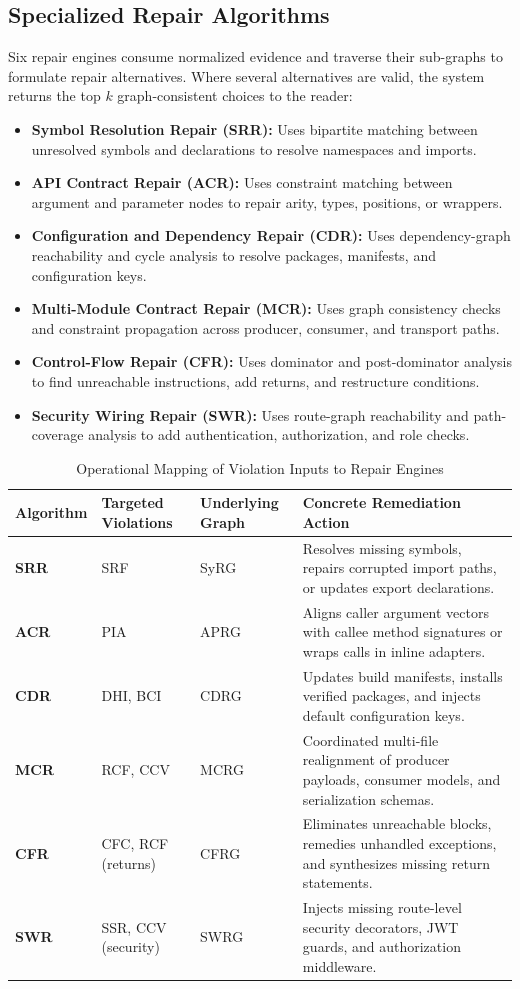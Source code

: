 \documentclass[10pt,a4paper]{article}
\begin{document}
\subsection{Specialized Repair Algorithms}
Six repair engines consume normalized evidence and traverse their sub-graphs to formulate repair alternatives. Where several alternatives are valid, the system returns the top $k$ graph-consistent choices to the reader:
\begin{itemize}
  \item \textbf{Symbol Resolution Repair (SRR):} Uses bipartite matching between unresolved symbols and declarations to resolve namespaces and imports.
  \item \textbf{API Contract Repair (ACR):} Uses constraint matching between argument and parameter nodes to repair arity, types, positions, or wrappers.
  \item \textbf{Configuration and Dependency Repair (CDR):} Uses dependency-graph reachability and cycle analysis to resolve packages, manifests, and configuration keys.
  \item \textbf{Multi-Module Contract Repair (MCR):} Uses graph consistency checks and constraint propagation across producer, consumer, and transport paths.
  \item \textbf{Control-Flow Repair (CFR):} Uses dominator and post-dominator analysis to find unreachable instructions, add returns, and restructure conditions.
  \item \textbf{Security Wiring Repair (SWR):} Uses route-graph reachability and path-coverage analysis to add authentication, authorization, and role checks.
\end{itemize}

\begin{table}[h!]
\centering
\scriptsize
\caption{Operational Mapping of Violation Inputs to Repair Engines}
\label{tab:repair_mapping}
\begin{tabularx}{\textwidth}{>{\bfseries}l l l X}
\toprule
Algorithm & Targeted Violations & Underlying Graph & Concrete Remediation Action \\
\midrule
SRR & SRF & SyRG & Resolves missing symbols, repairs corrupted import paths, or updates export declarations. \\
ACR & PIA & APRG & Aligns caller argument vectors with callee method signatures or wraps calls in inline adapters. \\
CDR & DHI, BCI & CDRG & Updates build manifests, installs verified packages, and injects default configuration keys. \\
MCR & RCF, CCV & MCRG & Coordinated multi-file realignment of producer payloads, consumer models, and serialization schemas. \\
CFR & CFC, RCF (returns) & CFRG & Eliminates unreachable blocks, remedies unhandled exceptions, and synthesizes missing return statements. \\
SWR & SSR, CCV (security) & SWRG & Injects missing route-level security decorators, JWT guards, and authorization middleware. \\
\bottomrule
\end{tabularx}
\vspace{-4pt}
\end{table}
\end{document}
